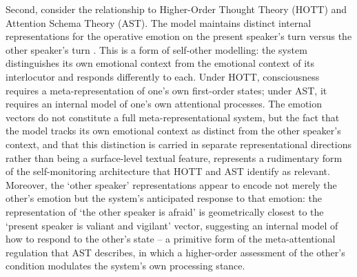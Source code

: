 \documentclass[11pt, a4paper, onecolumn, gdm]{google}
\begin{document}
Second, consider the relationship to Higher-Order Thought Theory (HOTT) and Attention Schema Theory (AST).
The model maintains distinct internal representations for the operative emotion on the present speaker's turn versus the other speaker's turn \citep{sofroniew2026}.
This is a form of self-other modelling: the system distinguishes its own emotional context from the emotional context of its interlocutor and responds differently to each.
Under HOTT, consciousness requires a meta-representation of one's own first-order states; under AST, it requires an internal model of one's own attentional processes.
The emotion vectors do not constitute a full meta-representational system, but the fact that the model tracks its own emotional context as distinct from the other speaker's context, and that this distinction is carried in separate representational directions rather than being a surface-level textual feature, represents a rudimentary form of the self-monitoring architecture that HOTT and AST identify as relevant.
Moreover, the `other speaker' representations appear to encode not merely the other's emotion but the system's anticipated response to that emotion: the representation of `the other speaker is afraid' is geometrically closest to the `present speaker is valiant and vigilant' vector, suggesting an internal model of how to respond to the other's state -- a primitive form of the meta-attentional regulation that AST describes, in which a higher-order assessment of the other's condition modulates the system's own processing stance.
\end{document}
